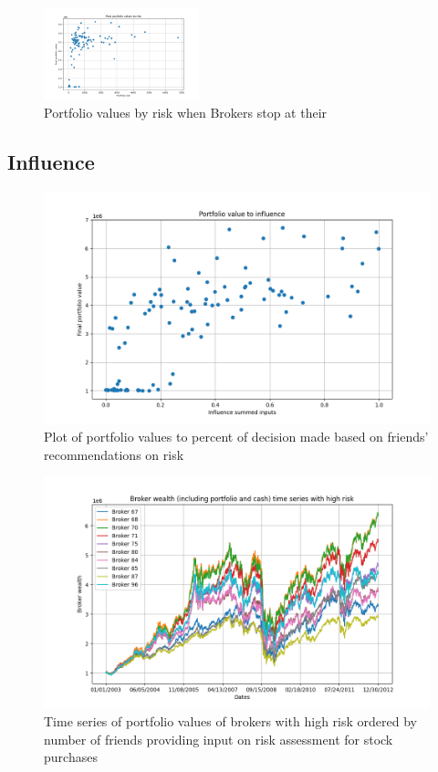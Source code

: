\documentclass[letterpaper, 10 pt, proceedings]{ieeetran}
\begin{document}
	\begin{figure}[h]
		\centering
		\includegraphics[width=0.4\textwidth]{valueToRisk_stopatstable.png}
		\caption{Portfolio values by risk when Brokers stop at their }
		\label{stopatstable}
	\end{figure}
	\FloatBarrier

	
	
	\subsection{Influence}
	
	\begin{figure}[h]
		\centering
		\includegraphics[width=.4\textwidth]{valueToInfluence_influence04.png}
		\caption{Plot of portfolio values to percent of decision made based on friends' recommendations on risk}
		\label{fig:value_to_influence_influencerun}
	\end{figure}	
	\FloatBarrier
	
	\begin{figure}[h]
		\centering
		\includegraphics[width=.4\textwidth]{timeSeriesJoint_influenceRun04_HighRisk.png}
		\caption{Time series of portfolio values of brokers with high risk ordered by number of friends providing input on risk assessment for stock purchases}
		\label{fig:high_risk_influence_time_series}
	\end{figure}	
	\FloatBarrier
\end{document}
